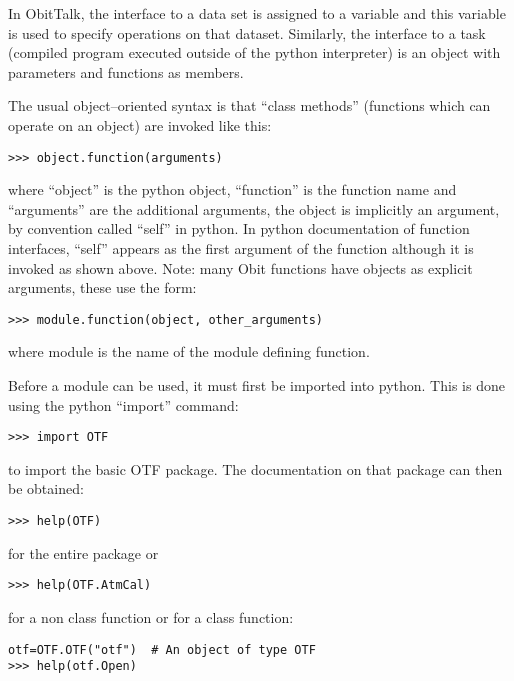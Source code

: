 \documentclass[11pt]{report}
\begin{document}
In ObitTalk, the interface to a  data set is assigned to a variable and
this variable is used to specify operations on that dataset.
Similarly, the interface to a task (compiled program executed outside
of the python interpreter) is an object with parameters and functions
as members.

The usual object--oriented syntax is that ``class methods'' (functions
which can operate on an object)  are invoked like this:
\begin{verbatim}
>>> object.function(arguments)
\end{verbatim}
where ``object'' is the python object, ``function'' is the function
name and ``arguments'' are the additional arguments, the object is
implicitly an argument, by convention called ``self'' in python.
In python documentation of function interfaces, ``self'' appears as the
first argument of the function although it is invoked as shown above.
Note: many Obit functions have objects as explicit arguments, these use the
form:
\begin{verbatim}
>>> module.function(object, other_arguments)
\end{verbatim}
where module is the name of the module defining function.

Before a module can be used, it must first be imported into python.
This is done using the python ``import'' command:
\begin{verbatim}
>>> import OTF
\end{verbatim}
to import the basic OTF package.
The documentation on that package can then be obtained:
\begin{verbatim}
>>> help(OTF)
\end{verbatim}
for the entire package
or 
\begin{verbatim}
>>> help(OTF.AtmCal)
\end{verbatim}
for a non class function or for a class function:
\begin{verbatim}
otf=OTF.OTF("otf")  # An object of type OTF
>>> help(otf.Open)
\end{verbatim}
\end{document}
